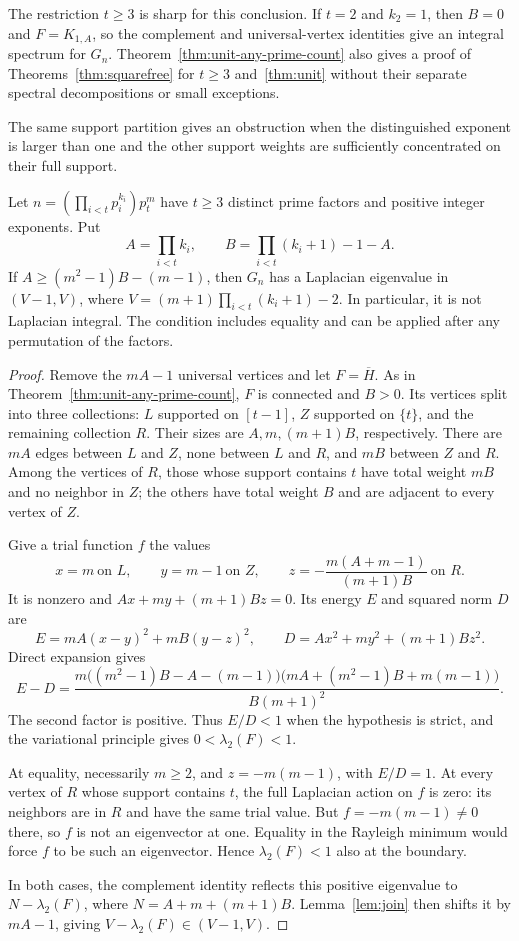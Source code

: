 The restriction $t\geq3$ is sharp for this conclusion. If $t=2$
and $k_2=1$, then $B=0$ and $F=K_{1,A}$, so the complement and
universal-vertex identities give an integral spectrum for $G_n$.
Theorem~\ref{thm:unit-any-prime-count} also gives a proof of
Theorems~\ref{thm:squarefree} for $t\geq3$ and~\ref{thm:unit}
without their separate spectral decompositions or small exceptions.

The same support partition gives an obstruction when the distinguished
exponent is larger than one and the other support weights are sufficiently
concentrated on their full support.

\begin{theorem}
\label{thm:small-exponent-rayleigh}
Let $n=(\prod_{i<t}p_i^{k_i})p_t^m$ have $t\geq3$ distinct prime
factors and positive integer exponents. Put
\[
 A=\prod_{i<t}k_i,\qquad B=\prod_{i<t}(k_i+1)-1-A.
\]
If $A\geq(m^2-1)B-(m-1)$, then $G_n$ has a Laplacian eigenvalue
in $(V-1,V)$, where $V=(m+1)\prod_{i<t}(k_i+1)-2$.
In particular, it is not Laplacian integral. The condition includes
equality and can be applied after any permutation of the factors.
\end{theorem}
\begin{proof}
Remove the $mA-1$ universal vertices and let $F=\overline H$.
As in Theorem~\ref{thm:unit-any-prime-count}, $F$ is connected and
$B>0$. Its vertices split into three collections: $L$ supported on
$[t-1]$, $Z$ supported on $\{t\}$, and the remaining collection $R$.
Their sizes are $A,m,(m+1)B$, respectively. There are $mA$ edges
between $L$ and $Z$, none between $L$ and $R$, and $mB$ between
$Z$ and $R$. Among the vertices of $R$, those whose support contains
$t$ have total weight $mB$ and no neighbor in $Z$; the others have
total weight $B$ and are adjacent to every vertex of $Z$.

Give a trial function $f$ the values
\[
 x=m\ \text{on }L,\qquad y=m-1\ \text{on }Z,\qquad
 z=-\frac{m(A+m-1)}{(m+1)B}\ \text{on }R.
\]
It is nonzero and $Ax+my+(m+1)Bz=0$. Its energy $E$ and squared
norm $D$ are
\[
 E=mA(x-y)^2+mB(y-z)^2,\qquad
 D=Ax^2+my^2+(m+1)Bz^2.
\]
Direct expansion gives
\[
 E-D=\frac{m\bigl((m^2-1)B-A-(m-1)\bigr)
                 \bigl(mA+(m^2-1)B+m(m-1)\bigr)}{B(m+1)^2}.
\]
The second factor is positive. Thus $E/D<1$ when the hypothesis
is strict, and the variational principle gives $0<\lambda_2(F)<1$.

At equality, necessarily $m\geq2$, and $z=-m(m-1)$, with $E/D=1$.
At every vertex of $R$ whose support contains $t$, the full Laplacian
action on $f$ is zero: its neighbors are in $R$ and have the same
trial value. But $f=-m(m-1)\ne0$ there, so $f$ is not an eigenvector
at one. Equality in the Rayleigh minimum would force $f$ to be such
an eigenvector. Hence $\lambda_2(F)<1$ also at the boundary.

In both cases, the complement identity reflects this positive
eigenvalue to $N-\lambda_2(F)$, where $N=A+m+(m+1)B$.
Lemma~\ref{lem:join} then shifts it by $mA-1$, giving
$V-\lambda_2(F)\in(V-1,V)$.
\end{proof}

